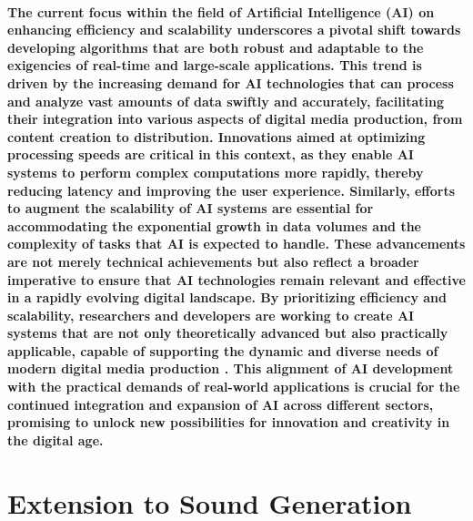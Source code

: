 \documentclass[11pt,a4paper,oneside]{report}
\begin{document}
\paragraph{The current focus within the field of Artificial Intelligence (AI) on enhancing efficiency and scalability underscores a pivotal shift towards developing algorithms that are both robust and adaptable to the exigencies of real-time and large-scale applications. This trend is driven by the increasing demand for AI technologies that can process and analyze vast amounts of data swiftly and accurately, facilitating their integration into various aspects of digital media production, from content creation to distribution. Innovations aimed at optimizing processing speeds are critical in this context, as they enable AI systems to perform complex computations more rapidly, thereby reducing latency and improving the user experience. Similarly, efforts to augment the scalability of AI systems are essential for accommodating the exponential growth in data volumes and the complexity of tasks that AI is expected to handle. These advancements are not merely technical achievements but also reflect a broader imperative to ensure that AI technologies remain relevant and effective in a rapidly evolving digital landscape. By prioritizing efficiency and scalability, researchers and developers are working to create AI systems that are not only theoretically advanced but also practically applicable, capable of supporting the dynamic and diverse needs of modern digital media production \cite{habibian2021skip}. This alignment of AI development with the practical demands of real-world applications is crucial for the continued integration and expansion of AI across different sectors, promising to unlock new possibilities for innovation and creativity in the digital age.}

\section{Extension to Sound Generation}
\end{document}
